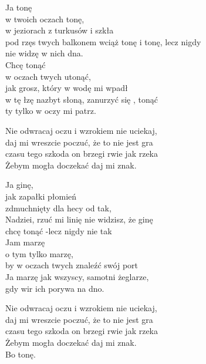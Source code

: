 \begin{text}
    Ja tonę\\
    w twoich oczach tonę,\\
    w jeziorach z turkusów i szkła\\
    pod rzęs twych balkonem wciąż tonę i tonę, lecz nigdy\\
    nie widzę w nich dna.\\
    Chcę tonąć\\
    w oczach twych utonąć,\\
    jak grosz, który w wodę mi wpadł\\
    w tę łzę nazbyt słoną, zanurzyć się , tonąć\\
    ty tylko w oczy mi patrz.

    Nie odwracaj oczu i wzrokiem nie uciekaj,\\
    daj mi wreszcie poczuć, że to nie jest gra\\
    czasu tego szkoda on brzegi rwie jak rzeka\\
    Żebym mogła doczekać daj mi znak.

    Ja ginę,\\
    jak zapałki płomień\\
    zdmuchnięty dla hecy od tak,\\
    Nadziei, rzuć mi linię nie widzisz, że ginę\\
    chcę tonąć -lecz nigdy nie tak\\
    Jam marzę\\
    o tym tylko marzę,\\
    by w oczach twych znaleźć swój port\\
    Ja marzę jak wszyscy, samotni żeglarze,\\
    gdy wir ich porywa na dno.

    Nie odwracaj oczu i wzrokiem nie uciekaj,\\
    daj mi wreszcie poczuć, że to nie jest gra\\
    czasu tego szkoda on brzegi rwie jak rzeka\\
    Żebym mogła doczekać daj mi znak.\\
    Bo tonę.
\end{text}
\begin{chord}

\end{chord}